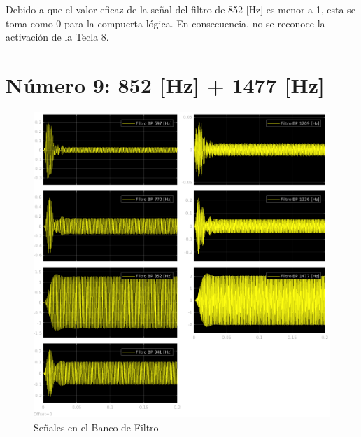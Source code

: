 Debido a que el valor eficaz de la señal del filtro de 852 [Hz] es menor a 1, esta se toma como 0 para la compuerta lógica. En consecuencia, no se reconoce la activación de la Tecla 8.


\section{Número 9: 852 [Hz] + 1477 [Hz]}
\label{sec:signal_9}
\begin{figure}[H]
  \centering
  \includegraphics[width=\linewidth]{images/simulacion/fallas/bank/9.png}
  \caption{Señales en el Banco de Filtro}
  \label{fig:num_9_bank}
\end{figure}

